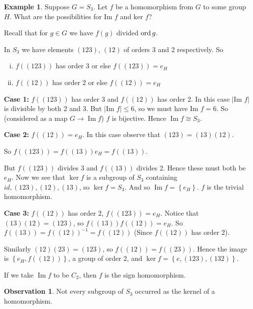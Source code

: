 \documentclass{article}
\theoremstyle{definition} \newtheorem*{definition}{Definition}
\newtheorem*{exmp}{Example} \newtheorem*{exmps}{Examples}
\newtheorem*{obvs}{Observation}
\DeclareMathOperator{\Ima}{Im} \DeclareMathOperator{\Sym}{Sym}
\begin{document}
\begin{exmp} Suppose $G=S_3$. Let $f$ be a homomorphism from $G$ to some group
  $H$. What are the possibilities for $\text{Im }f$ and $\text{ker }f$?

  Recall that for $g \in G$ we have $f(g)$ divided $\operatorname{\text{ord}} g$.

  In $S_3$ we have elements $(123)$, $(12)$ of orders 3 and 2 respectively. So
\begin{enumerate}[(i)] \item $f\left( (123) \right)$ has order 3 or else $f\left(
    (123) \right)=e_H$ \item $f\left( (12) \right)$ has order 2 or else
      $f\left( (12) \right)=e_H$ \end{enumerate}

  \textbf{Case 1:} $f\left( (123) \right)$ has order 3 and $f\left(
  (12)\right)$ has order 2. In this case $|\text{Im }f|$ is divisible by both 2
  and 3. But $|\text{Im }f| \leq 6$, so we must have $\text{Im } f=6$. So
  (considered as a map $G \rightarrow \Ima f$) $f$ is bijective. Hence $\Ima f
  \cong S_3$.

  \textbf{Case 2:} $f\left( (12) \right)=e_H$. In this case observe that
  $(123)=(13)(12)$.

  So $f\left( (123) \right)=f\left( (13) \right)e_H=f\left( (13) \right)$.

  But $f\left( (123) \right)$ divides 3 and $f\left( (13) \right)$ divides 2.
  Hence these must both be $e_H$. Now we see that $\ker f$ is a subgroup of
  $S_3$ containing $id, (123), (12), (13)$, so $\ker f=S_3$. And so $\Ima f =
  \left\{ e_H \right\}$. $f$ is the trivial homomorphism.

  \textbf{Case 3:} $f\left( (12) \right)$ has order 2, $f\left( (123)
  \right)=e_H$. Notice that $(13)(12)=(123)$, so $f\left( (13) \right)f\left(
  (12) \right)=e_H$. So $f\left( (13) \right)=f\left( (12) \right)^{-1}=f\left(
  (12) \right)$ (Since $f\left( (12) \right)$ has order 2).

  Similarly $(12)(23)=(123)$, so $f\left( (12) \right)=f\left( (23) \right)$.
  Hence the image is $\left\{ e_H,f\left( (12) \right) \right\}$, a group of
  order 2, and $\ker f=\left\{ e,(123),(132) \right\}$.

  If we take $\Ima f$ to be $C_2$, then $f$ is the sign homomorphism.\\
  \begin{obvs}
  
  Not every subgroup of $S_3$ occurred as the kernel of a homomorphism.
\end{obvs} \end{exmp}
\end{document}
